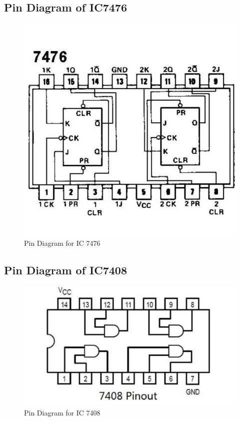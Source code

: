 \documentclass[11pt]{article}
\begin{document}
\subsection{Pin Diagram of IC7476}
\begin{figure}[H]
	\centering
	\includegraphics[scale = 0.35]{7476.jpg}
	\caption{Pin Diagram for IC 7476}
\end{figure}
\subsection{Pin Diagram of IC7408}
\begin{figure}[H]
	\centering
	\includegraphics[scale = 0.25]{7408.jpg}
	\caption{Pin Diagram for IC 7408}
\end{figure}
\end{document}
